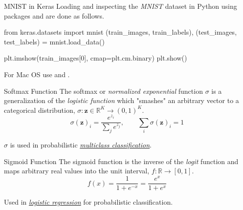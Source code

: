 \documentclass{cognito}
\begin{document}


\begin{note}{MNIST in Keras}
	Loading and inspecting the {\it MNIST} dataset in Python using packages  and 
	are done as follows.
	\begin{largecode}
 from keras.datasets import mnist
 (train_images, train_labels),
 	(test_images, test_labels) = mnist.load_data()
	\end{largecode}
	\vspace{-5pt}
	\begin{largecode}
 plt.imshow(train_images[0], cmap=plt.cm.binary) 
 plt.show()
	\end{largecode}
	\begin{remark} For Mac OS  use  and . \end{remark}\vspace{-5pt}
\end{note}


\begin{note}{Softmax Function}
	The softmax or {\it normalized exponential} function $\sigma$ is a generalization of the {\it logistic function}
	which "smashes" an arbitrary vector to a categorical distribution, $\sigma : \bm z \in \mathbb{R}^K \to (0, 1)^K$.
	$$
		\sigma(\bm z)_i = \frac{e^{z_i}}{\sum_j e^{z_j}}, \quad \quad \sum_i \sigma(\bm z)_i = 1
	$$
	\begin{remark} $\sigma$ is used in probabilistic \hyperref[note:Supervised Learning]{\it multiclass classification}. %
	\end{remark}
	\vspace{-5pt}
\end{note}

\begin{note}{Sigmoid Function}
	The sigmoid function is the inverse of the \emph{logit} function
	and maps arbitrary real values into the unit interval, $f:  \mathbb{R} \to [0, 1]$.
	$$
		f(x) = \frac{1}{1+ e^{-x}} = \frac{e^x}{1 + e^x}
	$$
	\begin{remark} Used in \hyperref[note:Logistic Regression]{\it logistic regression} for probabilistic classification.\end{remark}
	\vspace{-5pt}
\end{note}
\end{document}
